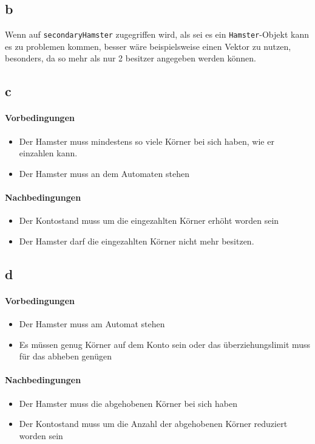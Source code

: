 \documentclass{article}
\begin{document}
\subsection*{b}
Wenn auf \verb|secondaryHamster| zugegriffen wird, als sei es ein \verb|Hamster|-Objekt
kann es zu problemen kommen, besser wäre beispielsweise einen Vektor zu nutzen, besonders,
da so mehr als nur 2 besitzer angegeben werden können.

\subsection*{c}
\paragraph{Vorbedingungen}
\begin{itemize}
    \item Der Hamster muss mindestens so viele Körner bei sich haben, wie er einzahlen kann.
    \item Der Hamster muss an dem Automaten stehen
\end{itemize}
\paragraph{Nachbedingungen}
\begin{itemize}
    \item Der Kontostand muss um die eingezahlten Körner erhöht worden sein
    \item Der Hamster darf die eingezahlten Körner nicht mehr besitzen.
\end{itemize}

\subsection*{d}
\paragraph{Vorbedingungen}
\begin{itemize}
    \item Der Hamster muss am Automat stehen
    \item Es müssen genug Körner auf dem Konto sein oder das überziehungslimit muss für das abheben genügen
\end{itemize}
\paragraph{Nachbedingungen}
\begin{itemize}
    \item Der Hamster muss die abgehobenen Körner bei sich haben
    \item Der Kontostand muss um die Anzahl der abgehobenen Körner reduziert worden sein
\end{itemize}
\end{document}
